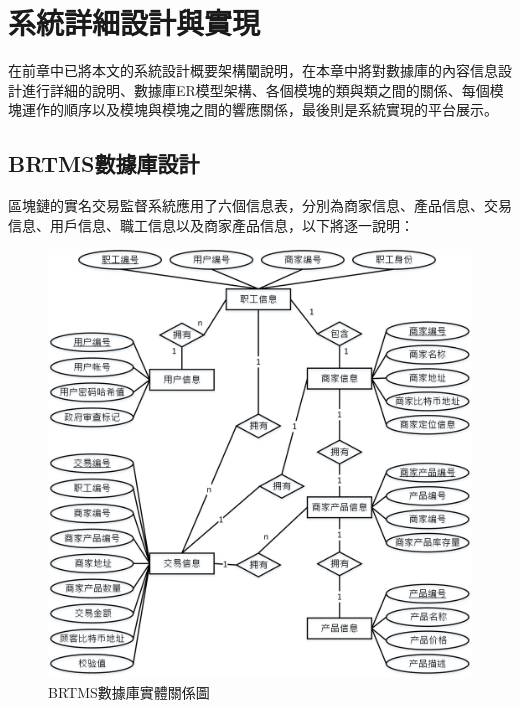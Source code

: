 \chapter{系統詳細設計與實現}
在前章中已將本文的系統設計概要架構闡說明，在本章中將對數據庫的內容信息設計進行詳細的說明、數據庫ER模型架構、各個模塊的類與類之間的關係、每個模塊運作的順序以及模塊與模塊之間的響應關係，最後則是系統實現的平台展示。

	\section{BRTMS數據庫設計}

	區塊鏈的實名交易監督系統應用了六個信息表，分別為商家信息、產品信息、交易信息、用戶信息、職工信息以及商家產品信息，以下將逐一說明：

		\begin{figure}[!htbp]
			\centering
			\includegraphics[width = 1\textwidth]{er.jpg}
			\caption{BRTMS數據庫實體關係圖}\label{db}
		\end{figure}

